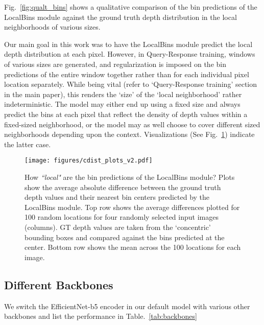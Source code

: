 \documentclass[runningheads]{llncs}
\begin{document}
Fig.~\ref{fig:qualt_bins} shows a qualitative comparison of the bin predictions of the LocalBins module against the ground truth depth distribution in the local neighborhoods of various sizes. 

Our main goal in this work was to have the LocalBins module predict the local depth distribution at each pixel. However, in Query-Response training, windows of various sizes are generated, and regularization is imposed on the bin predictions of the entire window together rather than for each individual pixel location separately. While being vital (refer to `Query-Response training' section in the main paper), this renders the `size' of the `local neighborhood' rather indeterministic. The model may either end up using a fixed size and always predict the bins at each pixel that reflect the density of depth values within a fixed-sized neighborhood, or the model may as well choose to cover different sized neighborhoods depending upon the context. Visualizations (See Fig.~\ref{fig:plot_dists}) indicate the latter case. 

\begin{figure}[t]
    \centering
    \texttt{[image: figures/cdist\_plots\_v2.pdf]}
    \caption{How \textit{``local"} are the bin predictions of the LocalBins module? Plots show the average absolute difference between the ground truth depth values and their nearest bin centers predicted by the LocalBins module. Top row shows the average differences plotted for 100 random locations for four randomly selected input images (columns). GT depth values are taken from the `concentric' bounding boxes and compared against the bins predicted at the center. Bottom row shows the mean across the 100 locations for each image.}
    \label{fig:plot_dists}
\end{figure}

\subsection{Different Backbones}

\begin{table}[]
\centering
{}
\caption{Performance of LocalBins with various backbone encoders}
\label{tab:backbones}
\end{table}


We switch the EfficientNet-b5 encoder in our default model with various other backbones and list the performance in Table.~\ref{tab:backbones}






\clearpage
\end{document}
